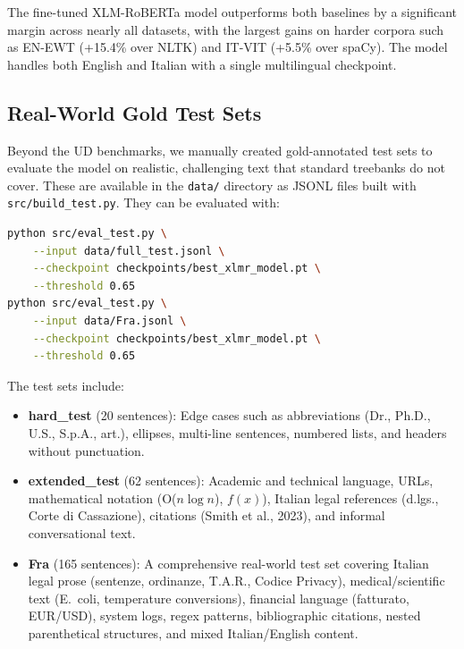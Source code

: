 \documentclass[11pt,a4paper]{article}
\begin{document}
The fine-tuned XLM-RoBERTa model outperforms both baselines by a
significant margin across nearly all datasets, with the largest gains on harder corpora
such as EN-EWT (+15.4\% over NLTK) and IT-VIT (+5.5\% over spaCy). The model
handles both English and Italian with a single multilingual checkpoint.

\subsection{Real-World Gold Test Sets}

Beyond the UD benchmarks, we manually created gold-annotated test sets to evaluate
the model on realistic, challenging text that standard treebanks do not cover.
These are available in the \texttt{data/} directory as JSONL files built with
\texttt{src/build\_test.py}. They can be evaluated with:

\begin{lstlisting}[language=bash]
python src/eval_test.py \
    --input data/full_test.jsonl \
    --checkpoint checkpoints/best_xlmr_model.pt \
    --threshold 0.65
python src/eval_test.py \
    --input data/Fra.jsonl \
    --checkpoint checkpoints/best_xlmr_model.pt \
    --threshold 0.65
\end{lstlisting}

The test sets include:

\begin{itemize}[nosep]
  \item \textbf{hard\_test} (20 sentences): Edge cases such as abbreviations
        (Dr., Ph.D., U.S., S.p.A., art.), ellipses, multi-line sentences,
        numbered lists, and headers without punctuation.
  \item \textbf{extended\_test} (62 sentences): Academic and technical language,
        URLs, mathematical notation (O($n \log n$), $f(x)$), Italian legal
        references (d.lgs., Corte di Cassazione), citations (Smith et al., 2023),
        and informal conversational text.
  \item \textbf{Fra} (165 sentences): A comprehensive real-world test set covering
        Italian legal prose (sentenze, ordinanze, T.A.R., Codice Privacy),
        medical/scientific text (E.\ coli, temperature conversions), financial
        language (fatturato, EUR/USD), system logs, regex patterns, bibliographic
        citations, nested parenthetical structures, and mixed Italian/English content.
\end{itemize}
\end{document}
